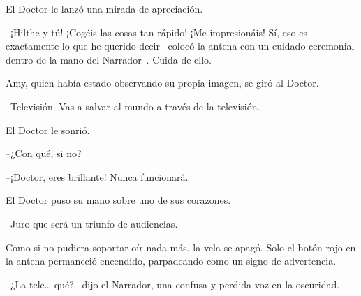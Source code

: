 {El Doctor le lanzó una mirada de apreciación.}

{--¡Hilthe y tú! ¡Cogéis las cosas tan rápido! ¡Me impresionáis! Sí,
	eso es exactamente lo que he querido decir --colocó la antena con un
cuidado ceremonial dentro de la mano del Narrador--. Cuida de ello.}

{Amy, quien había estado observando su propia imagen, se giró al
Doctor.}

{--Televisión. Vas a salvar al mundo a través de la televisión.}

{El Doctor le sonrió.}

{--¿Con qué, si no?}

{--¡Doctor, eres brillante! Nunca funcionará.}

{El Doctor puso su mano sobre uno de sus corazones.}

{--Juro que será un triunfo de audiencias.}

{Como si no pudiera soportar oír nada más, la vela se apagó. Solo el
	botón rojo en la antena permaneció encendido, parpadeando como un signo
de advertencia.}

{--¿La tele\ldots{} qué? --dijo el Narrador, una confusa y perdida voz
en la oscuridad.}
